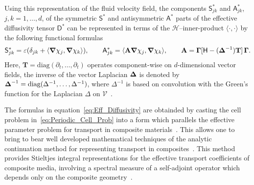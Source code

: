 \documentclass[leqno,onefignum,onetabnum]{siamltex1213}
\newcommand{\Tb}{\mathbf{T}}
\newcommand{\Ab}{\mathbf{A}}
\newcommand{\bI}{\mathbf{I}}
\newcommand{\Vc}{\mathcal{V}}
\newcommand{\Hc}{\mathcal{H}}
\newcommand{\Dm}{\mathsf{D}}
\newcommand{\Hm}{\mathsf{H}}
\newcommand{\Sm}{\mathsf{S}}
\newcommand{\Am}{\mathsf{A}}
\newcommand\bDelta{\mbox{\boldmath${\Delta}$}}
\newcommand\bGamma{\mbox{\boldmath${\Gamma}$}}
\newcommand\bnabla{\mbox{\boldmath${\nabla}$}}
\begin{document}
Using
this representation of the fluid velocity field, the components
$\Sm^*_{jk}$ and $\Am^*_{jk}$, $j,k=1,\ldots,d$, of the symmetric $\Sm^*$
and antisymmetric $\Am^*$ parts of the effective diffusivity tensor
$\Dm^*$ can be represented in terms of the $\Hc$--inner-product
$\langle\cdot,\cdot\rangle$ by the following functional
formulas~\cite{Avellaneda:PRL-753,Avellaneda:CMP-339}   
%
\begin{align}\label{eq:Eff_Diffusivity}
 \Sm^*_{jk}=\varepsilon(\delta_{jk}+\langle\bnabla \chi_j,\bnabla \chi_k\rangle), 
  \qquad
 \Am^*_{jk}=\langle\Ab\bnabla \chi_j,\bnabla \chi_k\rangle, 
  \qquad
 \Ab=\bGamma[\Hm-(\bDelta^{-1})\Tb]\,\bGamma.
\end{align}
%
Here, $\Tb=\text{diag}(\partial_t,\ldots,\partial_t)$ operates component-wise on
$d$-dimensional vector fields, the inverse of the vector Laplacian
$\bDelta$ is denoted by $\bDelta^{-1}=\text{diag}(\Delta^{-1},\ldots,\Delta^{-1})$,
where $\Delta^{-1}$ is based on convolution with the
Green's function for the Laplacian $\Delta$ on
$\Vc$~\cite{Stakgold:BVP:2000}.  





The formulas in equation~\eqref{eq:Eff_Diffusivity} are obtainded by
casting the cell problem in~\eqref{eq:Periodic_Cell_Prob} into a form
which parallels the effective parameter problem for transport in
composite materials~\cite{Avellaneda:PRL-753,Avellaneda:CMP-339}. This
allows one to bring to bear well developed mathematical techniques of
the analytic continuation method for representing transport in
composites~\cite{Golden:CMP-473,MILTON:2002:TC}. This method provides
Stieltjes integral representations for the effective transport
coefficients of composite media, involving a spectral measure of a
self-adjoint operator which depends only on the composite
geometry~\cite{Golden:CMP-473,Murphy:JMP:063506,MILTON:2002:TC}.
\end{document}
